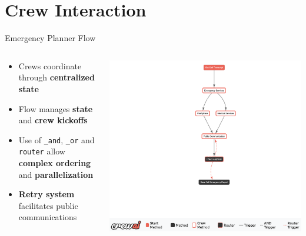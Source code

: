 \section{Crew Interaction}
\begin{frame}{Emergency Planner Flow}
    \begin{columns}
        \begin{column}{0.45\textwidth}
            \begin{itemize}
                \item Crews coordinate through \textbf{centralized state}
                \item Flow manages \textbf{state} and \textbf{crew kickoffs}
                \item Use of \texttt{\_and}, \texttt{\_or} and \texttt{router} allow \textbf{complex ordering} and \textbf{parallelization}
                \item \textbf{Retry system} facilitates public communications
            \end{itemize}
        \end{column}
        \begin{column}{0.55\textwidth}
            \includegraphics[width=\textwidth]{../figures/coordination_flow.png}
        \end{column}
    \end{columns}
\end{frame}

